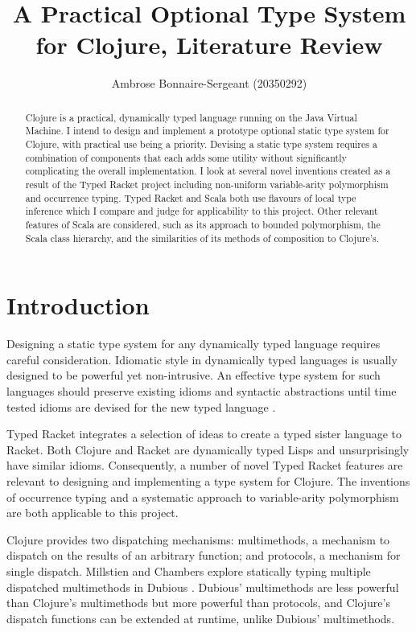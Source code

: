 \documentclass[12pt, a4paper]{article}
\title{A Practical Optional Type System for Clojure, Literature Review}
\author{Ambrose Bonnaire-Sergeant (20350292)}
\begin{document}
\maketitle

\begin{abstract}
Clojure is a practical, dynamically typed language running on the Java Virtual Machine.
I intend to design and implement a prototype optional static type 
system for Clojure, with practical use being a priority. Devising a static type system 
requires a combination of components that each adds some utility
without significantly complicating the overall implementation.
I look at several novel inventions created as a result 
of the Typed Racket project including
non-uniform variable-arity polymorphism and occurrence typing.
Typed Racket and Scala both use flavours of local type inference
which I compare and judge for applicability to this project.
Other relevant features of Scala are considered, such as its approach to bounded polymorphism,
the Scala class hierarchy, and the similarities of its methods of composition to Clojure's.
\end{abstract}

\tableofcontents

\section{Introduction}

Designing a static type system for any dynamically typed language requires
careful consideration. Idiomatic style in dynamically typed languages is usually
designed to be powerful yet non-intrusive. An effective type system
for such languages should preserve existing idioms and syntactic abstractions
until time tested idioms are devised for the new typed language \cite{SAMTH:dissertation}.

Typed Racket \cite{SAMTH:dissertation} integrates a selection of ideas to
create a typed sister language to Racket.
Both Clojure and Racket are dynamically typed Lisps and unsurprisingly have similar idioms. 
Consequently, a number of novel Typed Racket features are relevant to designing and implementing 
a type system for Clojure.
The inventions of occurrence typing \cite{Tobin-Hochstadt:2010:LTU:1932681.1863561}
and a systematic approach to variable-arity polymorphism
\cite{Strickland:2009:PVP:1532974.1532978}
are both applicable to this project.

Clojure provides two dispatching mechanisms: multimethods, a mechanism to dispatch on the
results of an arbitrary function; and protocols, a mechanism for single dispatch.
Millstien and Chambers explore statically typing multiple dispatched multimethods in Dubious \cite{Millstein02modularstatically}.
Dubious' multimethods are less powerful than Clojure's multimethods but more powerful than protocols,
and Clojure's dispatch functions can be extended at runtime, unlike Dubious' multimethods.
\end{document}
